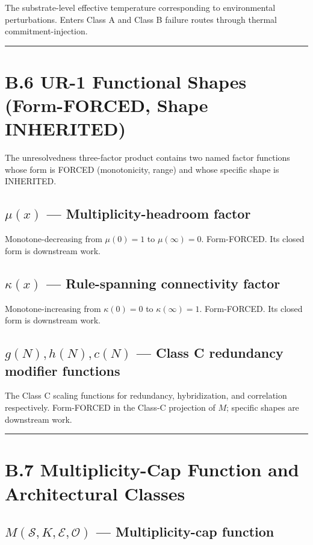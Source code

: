 \documentclass[11pt]{book}
\begin{document}
The substrate-level effective temperature corresponding to environmental perturbations. Enters Class A and Class B failure routes through thermal commitment-injection.

\bigskip\hrule\bigskip

\section{B.6 UR-1 Functional Shapes (Form-FORCED, Shape INHERITED)}

The unresolvedness three-factor product contains two named factor functions whose form is FORCED (monotonicity, range) and whose specific shape is INHERITED.

\subsection{$\mu(x)$ — Multiplicity-headroom factor}

Monotone-decreasing from $\mu(0)=1$ to $\mu(\infty)=0$. Form-FORCED. Its closed form is downstream work.

\subsection{$\kappa(x)$ — Rule-spanning connectivity factor}

Monotone-increasing from $\kappa(0)=0$ to $\kappa(\infty)=1$. Form-FORCED. Its closed form is downstream work.

\subsection{$g(N), h(N), c(N)$ — Class C redundancy modifier functions}

The Class C scaling functions for redundancy, hybridization, and correlation respectively. Form-FORCED in the Class-C projection of $M$; specific shapes are downstream work.

\bigskip\hrule\bigskip

\section{B.7 Multiplicity-Cap Function and Architectural Classes}

\subsection{$M(\mathcal{S}, K, \mathcal{E}, \mathcal{O})$ — Multiplicity-cap function}
\end{document}
